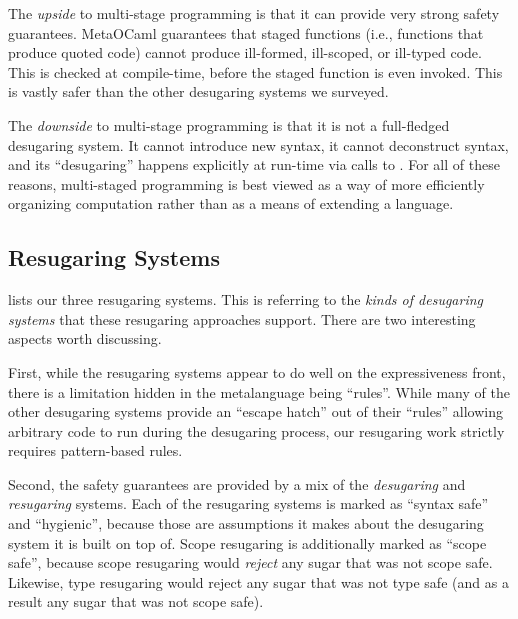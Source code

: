 The \emph{upside} to multi-stage programming is that it can provide
very strong safety guarantees. MetaOCaml guarantees that staged
functions (i.e., functions that produce quoted code) cannot produce
ill-formed, ill-scoped, or ill-typed code. This is checked at
compile-time, before the staged function is even invoked. This is
vastly safer than the other desugaring systems we surveyed.

The \emph{downside} to multi-stage programming is that it is not a
full-fledged desugaring system. It cannot introduce new syntax, it
cannot deconstruct syntax, and its ``desugaring'' happens explicitly
at run-time via calls to . For all of these reasons,
multi-staged programming is best viewed as a way of more efficiently
organizing computation rather than as a means of extending a language.

\subsection{Resugaring Systems}

 lists our three resugaring systems. This
is referring to the \emph{kinds of desugaring systems} that these
resugaring approaches support. There are two interesting aspects worth
discussing.

First, while the resugaring systems appear to do well on the
expressiveness front, there is a limitation hidden in the metalanguage
being ``rules''.  While many of the other desugaring systems provide
an ``escape hatch'' out of their ``rules'' allowing arbitrary code to
run during the desugaring process, our resugaring work strictly
requires pattern-based rules.

Second, the safety guarantees are provided by a mix of the
\emph{desugaring} and \emph{resugaring} systems. Each of the resugaring
systems is marked as ``syntax safe'' and ``hygienic'', because those
are assumptions it makes about the desugaring system it is built on
top of. Scope resugaring is additionally marked as ``scope safe'',
because scope resugaring would \emph{reject} any sugar that was not
scope safe. Likewise, type resugaring would reject any sugar that was
not type safe (and as a result any sugar that was not scope safe).
